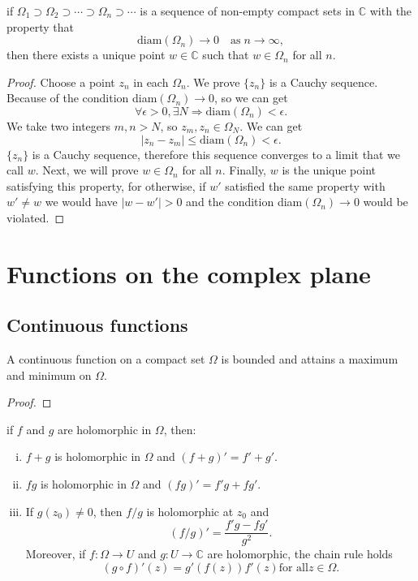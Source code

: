 \begin{proposition}
    if $\Omega_1\supset\Omega_2\supset\cdots\supset\Omega_n\supset\cdots$ is a sequence
    of non-empty compact sets in $\mathbb{C}$ with the property that
    \[
        \text{diam}(\Omega_n)\to 0\quad\text{as}\; n\to\infty,
    \]
    then there exists a unique point $w\in\mathbb{C}$ such
    that $w\in\Omega_n$ for all $n$.
\end{proposition}
\begin{proof}
    Choose a point $z_n$ in each $\Omega_n$. We prove $\{z_n\}$ is a Cauchy sequence.
    Because of the condition diam$(\Omega_n)\to 0$, so we can get
    \[
        \forall \epsilon>0, \exists N\Rightarrow \text{diam}(\Omega_n)<\epsilon.
    \]
    We take two integers $m,n>N$, so $z_m,z_n\in\Omega_N$. We can get
    \[
        |z_n-z_m|\le \text{diam}(\Omega_n)<\epsilon.
    \]
    $\{z_n\}$ is a Cauchy sequence, therefore this sequence converges to a limit that
    we call $w$. Next, we will prove $w\in \Omega_n$ for all $n$. Finally, $w$ is the
    unique point satisfying this property, for otherwise, if $w'$ satisfied the same
    property with $w'\ne w$ we would have $|w-w'|>0$ and the
    condition diam$(\Omega_n)\to 0$ would be violated.
\end{proof}

\section{Functions on the complex plane}

\subsection{Continuous functions}

\begin{theorem}
    A continuous function on a compact set $\Omega$ is bounded and attains
    a maximum and minimum on $\Omega$.
\end{theorem}
\begin{proof}
    
\end{proof}

\begin{proposition}
    if $f$ and $g$ are holomorphic in $\Omega$, then:
    \begin{enumerate}[(i)]
    \item $f+g$ is holomorphic in $\Omega$ and $(f+g)'=f'+g'$.
    \item $fg$ is holomorphic in $\Omega$ and $(fg)'=f'g+fg'$.
    \item If $g(z_0)\ne 0$, then $f/g$ is holomorphic at $z_0$ and
    \[
        (f/g)'=\frac{f'g-fg'}{g^2}.
    \]
    Moreover, if $f:\Omega\to U$ and $g:U\to\mathbb{C}$ are holomorphic, the chain
    rule holds
    \[
        (g\circ f)'(z)=g'(f(z))f'(z) \text{for all} z\in\Omega.
    \]
    \end{enumerate}
\end{proposition}